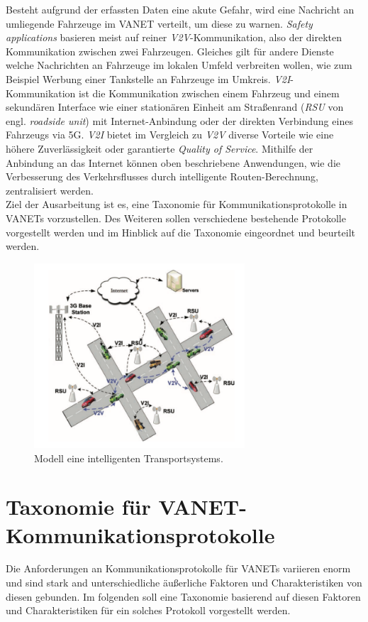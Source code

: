 \documentclass[english,runningheads,a4paper]{llncs}[2018/03/10]
\begin{document}
Besteht aufgrund der erfassten Daten eine akute Gefahr, wird eine Nachricht an umliegende Fahrzeuge im VANET verteilt, um diese zu warnen.
\textit{Safety applications} basieren meist auf reiner \textit{V2V}-Kommunikation, also der direkten Kommunikation zwischen zwei Fahrzeugen.
Gleiches gilt für andere Dienste welche Nachrichten an Fahrzeuge im lokalen Umfeld verbreiten wollen, wie zum Beispiel Werbung einer Tankstelle an Fahrzeuge im Umkreis.
\textit{V2I}-Kommunikation ist die Kommunikation zwischen einem Fahrzeug und einem sekundären Interface wie einer stationären Einheit am Straßenrand (\textit{RSU} von engl. \textit{roadside unit}) mit Internet-Anbindung oder der direkten Verbindung eines Fahrzeugs via 5G\@.
\textit{V2I} bietet im Vergleich zu \textit{V2V} diverse Vorteile wie eine höhere Zuverlässigkeit oder garantierte \textit{Quality of Service}.
Mithilfe der Anbindung an das Internet können oben beschriebene Anwendungen, wie die Verbesserung des Verkehrsflusses durch intelligente Routen-Berechnung, zentralisiert werden\cite{conti2013mobile}.\\
Ziel der Ausarbeitung ist es, eine Taxonomie für Kommunikationsprotokolle in VANETs vorzustellen.
Des Weiteren sollen verschiedene bestehende Protokolle vorgestellt werden und im Hinblick auf die Taxonomie eingeordnet und beurteilt werden.

\begin{figure}[h]
  \centering
  \includegraphics[width=0.7\textwidth]{images/its-modell.png}
  \caption{Modell eine intelligenten Transportsystems\cite{conti2013mobile}.}
  \label{fig:its-modell}
\end{figure}

\section{Taxonomie für VANET-Kommunikationsprotokolle}
\label{sec:taxcommunicationprotocol}
Die Anforderungen an Kommunikationsprotokolle für VANETs variieren enorm und sind stark and unterschiedliche äußerliche Faktoren und Charakteristiken von diesen gebunden.
Im folgenden soll eine Taxonomie basierend auf diesen Faktoren und Charakteristiken für ein solches Protokoll vorgestellt werden.
\end{document}
